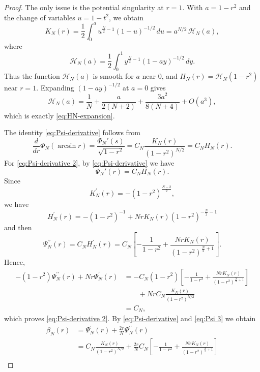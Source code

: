 \documentclass[11pt,letterpaper]{amsart}
\theoremstyle{definition}
\theoremstyle{remark}
\numberwithin{equation}{section}
\begin{document}
\begin{proof}
The only issue is the potential singularity at $r=1$.  With $a=1-r^2$ and the change of variables $u=1-t^2$, we obtain
\[
 K_N(r)=\frac12\int_0^a u^{\frac N2-1}(1-u)^{-1/2}\,du
       =a^{N/2}\,\mathcal H_N(a),
\]
where
\[
 \mathcal H_N(a)=\frac12\int_0^1 y^{\frac N2-1}(1-ay)^{-1/2}\,dy.
\]
Thus the function $\mathcal H_N(a)$ is smooth for $a$ near $0$, and $H_N(r)=\mathcal H_N(1-r^2)$ near $r=1$. Expanding $(1-ay)^{-1/2}$ at $a=0$ gives
\[
 \mathcal H_N(a)=\frac1N+\frac{a}{2(N+2)}+\frac{3a^2}{8(N+4)}+O(a^3),
\]
which is exactly \eqref{eq:HN-expansion}.

The identity \eqref{eq:Psi-derivative} follows from
\[
 \frac{d}{dr}\Phi_N(\arcsin r)
 =\frac{\Phi_N'(s)}{\sqrt{1-r^2}}
 =C_N\frac{K_N(r)}{(1-r^2)^{N/2}}
 =C_NH_N(r).
\]
For \eqref{eq:Psi-derivative 2}, by \eqref{eq:Psi-derivative} we have 
\begin{equation}
\Psi_N'(r)=C_NH_N(r).
\end{equation}
Since
\begin{equation}
K_N^{\prime}(r)=-\left(1-r^2\right)^{\frac{N-2}{2}},
\end{equation}
we have
$$
H_N^{\prime}(r) =-\left(1-r^2\right)^{-1}+N r K_N(r)\left(1-r^2\right)^{-\frac{N}{2}-1}
$$
and then
\begin{equation}\label{eq:Psi 3}
    \Psi_N^{\prime \prime}(r)=C_N H_N^{\prime}(r)=C_N\left[-\frac{1}{1-r^2}+\frac{N r K_N(r)}{\left(1-r^2\right)^{\frac{N}{2}+1}}\right] .
\end{equation}
Hence,
\begin{equation}
\begin{aligned}
-\left(1-r^2\right) \Psi_N^{\prime \prime}(r)+N r \Psi_N^{\prime}(r)&=  -C_N\left(1-r^2\right)\left[-\frac{1}{1-r^2}+\frac{N r K_N(r)}{\left(1-r^2\right)^{\frac{N}{2}+1}}\right] \\
&\qquad +N r C_N \frac{K_N(r)}{\left(1-r^2\right)^{N / 2}} \\
&=  C_N,
\end{aligned}
\end{equation}
which proves \eqref{eq:Psi-derivative 2}.
By \eqref{eq:Psi-derivative} and \eqref{eq:Psi 3} we obtain
\begin{equation}\label{eq:beta N}
\begin{aligned}
\beta_N(r) &=\Psi_N^{\prime}(r)+\frac{2 r}{N} \Psi_N^{\prime \prime}(r)\\
& =C_N \frac{K_N(r)}{\left(1-r^2\right)^{N / 2}}+\frac{2 r}{N} C_N\left[-\frac{1}{1-r^2}+\frac{N r K_N(r)}{\left(1-r^2\right)^{\frac{N}{2}+1}}\right] \\

\end{aligned}
\end{equation}
\end{proof}
\end{document}

